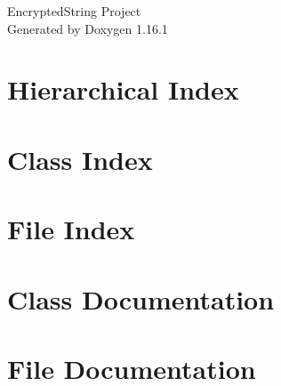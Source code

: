 \documentclass[twoside]{book}
\newcommand{\+}{\discretionary{\mbox{\scriptsize$\hookleftarrow$}}{}{}}
\newcommand{\clearemptydoublepage}{%
    \newpage{\pagestyle{empty}\cleardoublepage}%
  }
\begin{document}
  \raggedbottom
    \hypersetup{pageanchor=false,
                bookmarksnumbered=true,
                pdfencoding=unicode
               }
  \begin{titlepage}
  \vspace*{7cm}
  \begin{center}%
  {\Large Encrypted\+String Project}\\
  \vspace*{1cm}
  {\large Generated by Doxygen 1.16.1}\\
  \end{center}
  \end{titlepage}
  \clearemptydoublepage
  \tableofcontents
  \clearemptydoublepage
  \hypersetup{pageanchor=true}
\chapter{Hierarchical Index}

\chapter{Class Index}

\chapter{File Index}

\chapter{Class Documentation}







\chapter{File Documentation}














  \backmatter
  \newpage
  \clearemptydoublepage
  \printindex
\end{document}
